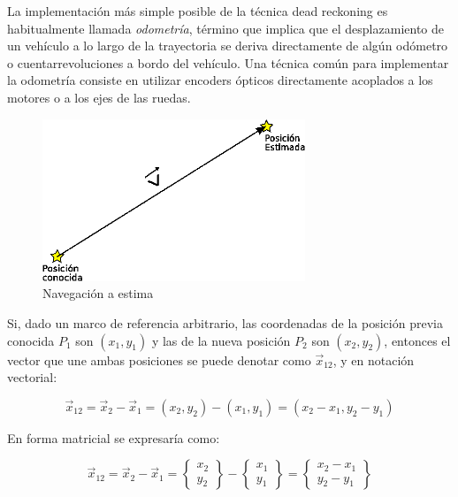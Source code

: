 \documentclass[a4paper,12pt,twoside]{article}
\begin{document}
  La implementaci\'on m\'as simple posible de la t\'ecnica dead
  reckoning es habitualmente llamada \emph{odometr\'ia}, t\'ermino que
  implica que el desplazamiento de un veh\'iculo a lo largo de la
  \gls{trayectoria} se deriva directamente de alg\'un od\'ometro o
  cuentarrevoluciones a bordo del veh\'iculo. Una t\'ecnica com\'un
  para implementar la odometr\'ia consiste en utilizar encoders
  \'opticos directamente acoplados a los motores o a los ejes de las
  ruedas.


\begin{figure}[!h]
  \centering
  \includegraphics[keepaspectratio,width=0.7\textwidth]{./Imagenes/dead-reckoning.png}
  \caption{Navegaci\'on a estima \cite{Salazar_nav_aerea}}
  \label{fig:dead-reckoning}
\end{figure}


Si, dado un marco de referencia arbitrario, las coordenadas de la posici\'on previa conocida $P_1$ son $(x_1, y_1)$ y las de la nueva posici\'on $P_2$ son $(x_2, y_2)$, entonces el vector que une ambas posiciones se puede denotar como $\vec x_{12}$, y en notaci\'on vectorial:


  \begin{equation}
\vec x_{12} = \vec x_2 - \vec x_1 = (x_2, y_2) - (x_1, y_1) = (x_2 - x_1, y_2 - y_1)
    \label{eq:dead-reckoning-vtor-posicion}
  \end{equation}



En forma matricial se expresar\'ia como:


\begin{equation}\label{eq:dead-reckoning-expresion-matricial}
 \vec x_{12} = \vec x_2 - \vec x_1 = 
\left\{ \begin{array}{c} x_2 \\ y_2 \end{array} \right\} 
- \left\{ \begin{array}{c} x_1 \\ y_1 \end{array} \right\} 
=
\left\{ \begin{array}{c} x_2 - x_1 \\ y_2 - y_1 \end{array} \right\}
\end{equation}
\end{document}
